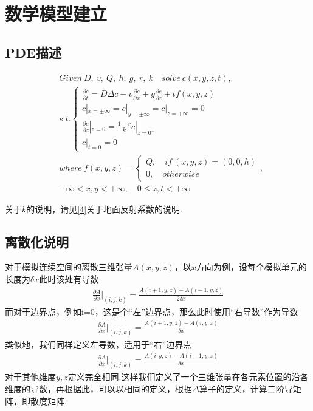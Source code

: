 \documentclass{article}
\begin{document}
	\section{数学模型建立}
	\subsection{PDE描述}\label{2}
	\begin{Large}
	\begin{align*}
		&Given ~ D, ~ v, ~ Q, ~h, ~g, ~r, ~k \quad solve ~ c(x,y,z,t),\\
		&s.t.
		\begin{cases}
			\frac{\partial c}{\partial t} = D\Delta c - v\frac{\partial c}{\partial x} + g\frac{\partial c}{\partial z} + tf(x,y,z)	\\
			c|_{x=\pm\infty}=c|_{y=\pm\infty}=c|_{z=+\infty}=0	\\
			\frac{\partial c}{\partial z}|_{z=0} = \frac{1-r}{k}c|_{z=0^+}	\\
			c|_{t=0}=0
		\end{cases}\\
		&where  ~
		f(x,y,z) = 
		\begin{cases}
			Q, \quad if~(x, y, z)=(0, 0, h)\\
			0, \quad otherwise
		\end{cases},\\
		&-\infty<x, y<+\infty, \quad 0\leq z, t<+\infty
	\end{align*}
	\end{Large}
	关于$k$的说明，请见\ref{4}关于地面反射系数的说明.

	\subsection{离散化说明}\label{3}
	对于模拟连续空间的离散三维张量$A(x, y, z)$，以$x$方向为例，设每个模拟单元的长度为$\delta x$此时该处有导数
	\begin{align*}
		\frac{\partial A}{\partial x}|_{(i, j, k)} = \frac{A(i+1, y, z)-A(i-1, y, z)}{2\delta x}
	\end{align*}
	而对于边界点，例如i=0，这是个“左”边界点，那么此时使用“右导数”作为导数
	\begin{align*}
		\frac{\partial A}{\partial x}|_{(i, j, k)} = \frac{A(i+1, y, z)-A(i, y, z)}{\delta x}
	\end{align*}
	类似地，我们同样定义左导数，适用于“右”边界点
	\begin{align*}
		\frac{\partial A}{\partial x}|_{(i, j, k)} = \frac{A(i, y, z)-A(i-1, y, z)}{\delta x}
	\end{align*}
	对于其他维度$y,z$定义完全相同.这样我们定义了一个三维张量在各元素位置的沿各维度的导数，再根据此，可以以相同的定义，根据$\Delta$算子的定义，计算二阶导矩阵，即散度矩阵.
	
\end{document}

